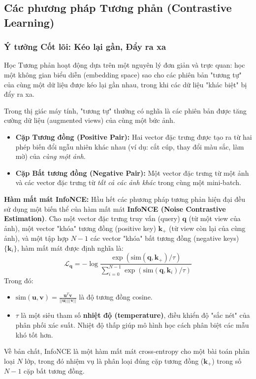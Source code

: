 \subsection{Các phương pháp Tương phản (Contrastive Learning)}
\label{subsec:contrastive_learning}

\subsubsection{Ý tưởng Cốt lõi: Kéo lại gần, Đẩy ra xa}
\label{subsubsec:contrastive_core_idea}
Học Tương phản hoạt động dựa trên một nguyên lý đơn giản và trực quan: học một không gian biểu diễn (embedding space) sao cho các phiên bản "tương tự" của cùng một dữ liệu được kéo lại gần nhau, trong khi các dữ liệu "khác biệt" bị đẩy ra xa.

Trong thị giác máy tính, "tương tự" thường có nghĩa là các phiên bản được tăng cường dữ liệu (augmented views) của cùng một bức ảnh.
\begin{itemize}
	\item \textbf{Cặp Tương đồng (Positive Pair):} Hai vector đặc trưng được tạo ra từ hai phép biến đổi ngẫu nhiên khác nhau (ví dụ: cắt cúp, thay đổi màu sắc, làm mờ) của \textit{cùng một ảnh}.
	\item \textbf{Cặp Bất tương đồng (Negative Pair):} Một vector đặc trưng từ một ảnh và các vector đặc trưng từ \textit{tất cả các ảnh khác} trong cùng một mini-batch.
\end{itemize}

\textbf{Hàm mất mát InfoNCE:}
Hầu hết các phương pháp tương phản hiện đại đều sử dụng một biến thể của hàm mất mát \textbf{InfoNCE (Noise Contrastive Estimation)}. Cho một vector đặc trưng truy vấn (query) $\mathbf{q}$ (từ một view của ảnh), một vector "khóa" tương đồng (positive key) $\mathbf{k}_+$ (từ view còn lại của cùng ảnh), và một tập hợp $N-1$ các vector "khóa" bất tương đồng (negative keys) $\{\mathbf{k}_i\}$, hàm mất mát được định nghĩa là:
\begin{equation}
	\mathcal{L}_{\mathbf{q}} = -\log \frac{\exp(\text{sim}(\mathbf{q}, \mathbf{k}_+) / \tau)}{\sum_{i=0}^{N-1} \exp(\text{sim}(\mathbf{q}, \mathbf{k}_i) / \tau)}
	\label{eq:infonce_loss}
\end{equation}
Trong đó:
\begin{itemize}
	\item $\text{sim}(\mathbf{u}, \mathbf{v}) = \frac{\mathbf{u}^T \mathbf{v}}{||\mathbf{u}|| ||\mathbf{v}||}$ là độ tương đồng cosine.
	\item $\tau$ là một siêu tham số \textbf{nhiệt độ (temperature)}, điều khiển độ "sắc nét" của phân phối xác suất. Nhiệt độ thấp giúp mô hình học cách phân biệt các mẫu khó tốt hơn.
\end{itemize}
Về bản chất, InfoNCE là một hàm mất mát cross-entropy cho một bài toán phân loại $N$ lớp, trong đó nhiệm vụ là phân loại đúng cặp tương đồng ($\mathbf{k}_+$) trong số $N-1$ cặp bất tương đồng.


